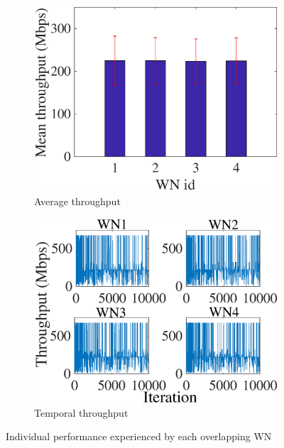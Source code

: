 \documentclass[12pt, a4paper,twoside]{tesi_upf}
\begin{document}
			\begin{figure}[t!]
				\centering
				\begin{subfigure}[b]{0.4\textwidth}
					\includegraphics[width=\textwidth]{images/e_1_a1_g095_avg_tpt}
					\caption{Average throughput}
					\label{fig:ql_avg_tpt}
				\end{subfigure}
				\begin{subfigure}[b]{0.4\textwidth}
					\includegraphics[width=\textwidth]{images/e_1_a1_g095_ind_tpt}
					\caption{Temporal throughput}
					\label{fig:ql_temporal_tpt}
				\end{subfigure}		
				\caption{Individual performance experienced by each overlapping WN \cite{wilhelmi2017implications}}
				\label{fig:ql_performance}
			\end{figure}
		
\end{document}

